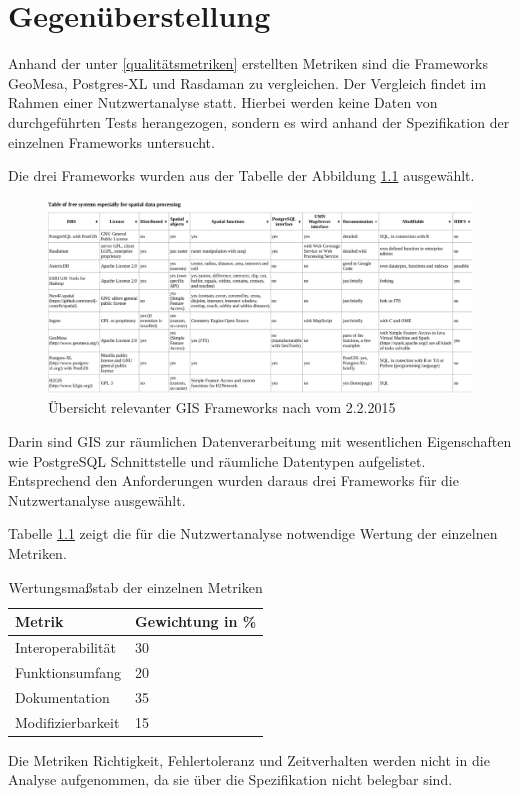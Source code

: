 \chapter{Gegenüberstellung}

Anhand der unter \ref{qualitätsmetriken} erstellten Metriken sind die Frameworks GeoMesa, Postgres-XL und Rasdaman zu vergleichen.
Der Vergleich findet im Rahmen einer Nutzwertanalyse statt.
Hierbei werden keine Daten von durchgeführten Tests herangezogen, sondern es wird anhand der Spezifikation der einzelnen Frameworks untersucht.

Die drei Frameworks wurden aus der Tabelle der Abbildung \ref{fig:spatialdatabases} ausgewählt.
\begin{figure}
\centering
\includegraphics[width=\textwidth]{Abbildungen/table_spatialdatabases.pdf}
\caption[Übersicht relevanter GIS Frameworks]{Übersicht relevanter GIS Frameworks nach \cite{website:wiki-spatialdatabase} vom 2.2.2015}
\label{fig:spatialdatabases}
\end{figure}
Darin sind GIS zur räumlichen Datenverarbeitung mit wesentlichen Eigenschaften wie PostgreSQL Schnittstelle und räumliche Datentypen aufgelistet.
Entsprechend den Anforderungen wurden daraus drei Frameworks für die Nutzwertanalyse ausgewählt.


Tabelle \ref{table:Wertungsmassstab} zeigt die für die Nutzwertanalyse notwendige Wertung der einzelnen Metriken.
\begin{table}[h]
\centering
\begin{tabular}{l|l}
\textbf{Metrik} & \textbf{Gewichtung in \%} \\ \hline
Interoperabilität & 30 \\ \hline
Funktionsumfang & 20 \\ \hline
Dokumentation & 35 \\ \hline
Modifizierbarkeit & 15
\end{tabular}
\caption{Wertungsmaßstab der einzelnen Metriken}
\label{table:Wertungsmassstab}
\end{table}
Die Metriken Richtigkeit, Fehlertoleranz und Zeitverhalten werden nicht in die Analyse aufgenommen, da sie über die Spezifikation nicht belegbar sind.

